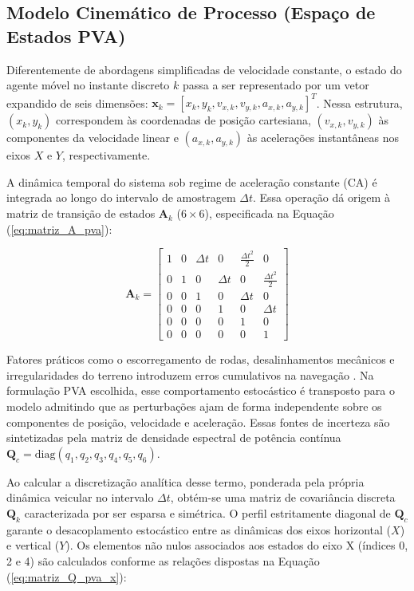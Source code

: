 \subsection{Modelo Cinemático de Processo (Espaço de Estados PVA)}
\label{subsec:pva_model}

Diferentemente de abordagens simplificadas de velocidade constante, o estado do agente móvel no instante discreto $k$ passa a ser representado por um vetor expandido de seis dimensões: $\mathbf{x}_k = [x_k, y_k, v_{x,k}, v_{y,k}, a_{x,k}, a_{y,k}]^T$. Nessa estrutura, $(x_k, y_k)$ correspondem às coordenadas de posição cartesiana, $(v_{x,k}, v_{y,k})$ às componentes da velocidade linear e $(a_{x,k}, a_{y,k})$ às acelerações instantâneas nos eixos $X$ e $Y$, respectivamente.

A dinâmica temporal do sistema sob regime de aceleração constante (CA) é integrada ao longo do intervalo de amostragem $\Delta t$. Essa operação dá origem à matriz de transição de estados $\mathbf{A}_k$ ($6 \times 6$), especificada na Equação (\ref{eq:matriz_A_pva}):

\begin{equation}
    \label{eq:matriz_A_pva}
    \mathbf{A}_k = \begin{bmatrix} 
    1 & 0 & \Delta t & 0 & \frac{\Delta t^2}{2} & 0 \\ 
    0 & 1 & 0 & \Delta t & 0 & \frac{\Delta t^2}{2} \\ 
    0 & 0 & 1 & 0 & \Delta t & 0 \\ 
    0 & 0 & 0 & 1 & 0 & \Delta t \\ 
    0 & 0 & 0 & 0 & 1 & 0 \\ 
    0 & 0 & 0 & 0 & 0 & 1 
    \end{bmatrix}
\end{equation}

Fatores práticos como o escorregamento de rodas, desalinhamentos mecânicos e irregularidades do terreno introduzem erros cumulativos na navegação \cite{thrun2005probabilistic}. Na formulação PVA escolhida, esse comportamento estocástico é transposto para o modelo admitindo que as perturbações ajam de forma independente sobre os componentes de posição, velocidade e aceleração. Essas fontes de incerteza são sintetizadas pela matriz de densidade espectral de potência contínua $\mathbf{Q}_c = \text{diag}(q_1, q_2, q_3, q_4, q_5, q_6)$. 

Ao calcular a discretização analítica desse termo, ponderada pela própria dinâmica veicular no intervalo $\Delta t$, obtém-se uma matriz de covariância discreta $\mathbf{Q}_k$ caracterizada por ser esparsa e simétrica. O perfil estritamente diagonal de $\mathbf{Q}_c$ garante o desacoplamento estocástico entre as dinâmicas dos eixos horizontal ($X$) e vertical ($Y$). Os elementos não nulos associados aos estados do eixo X (índices 0, 2 e 4) são calculados conforme as relações dispostas na Equação (\ref{eq:matriz_Q_pva_x}):

